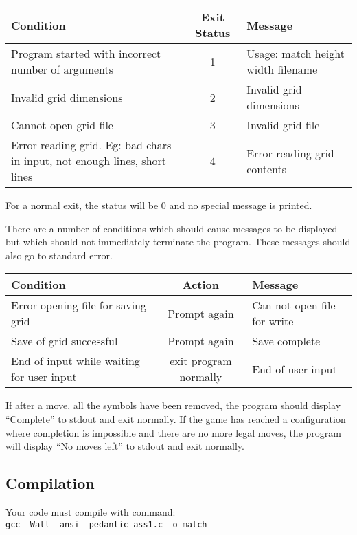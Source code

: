 \begin{center}
\begin{tabular}{|p{4cm}|c|p{5.5cm}|}\hline
\textbf{Condition} & \textbf{Exit Status} & \textbf{Message} \\\hline
Program started with incorrect number of arguments & 1 & Usage: match height width filename \\\hline
Invalid grid dimensions & 2 & Invalid grid dimensions \\\hline
Cannot open grid file& 3 & Invalid grid file \\\hline
Error reading grid. Eg: bad chars in input, not enough lines, short lines & 4 & Error reading grid contents \\\hline
\end{tabular}
\end{center}
For a normal exit, the status will be $0$ and no special message is printed.

There are a number of conditions which should cause messages to be displayed but which should not immediately terminate the program.
These messages should also go to standard error.

\begin{center}
\begin{tabular}{|p{5.0cm}|c|p{4cm}|}\hline
\textbf{Condition} & \textbf{Action} & \textbf{Message} \\\hline
Error opening file for saving grid & Prompt again & Can not open file for write \\\hline
Save of grid successful & Prompt again & Save complete \\\hline
End of input while waiting for user input & exit program normally & End of user input \\\hline
\end{tabular}
\end{center}

If after a move, all the symbols have been removed, the program should display ``Complete'' to stdout and exit normally.
If the game has reached a configuration where completion is impossible and there are no more legal moves,
the program will display ``No moves left'' to stdout and exit normally.

\subsection{Compilation}
Your code must compile with command:\\
\texttt{gcc -Wall -ansi -pedantic ass1.c -o match}

